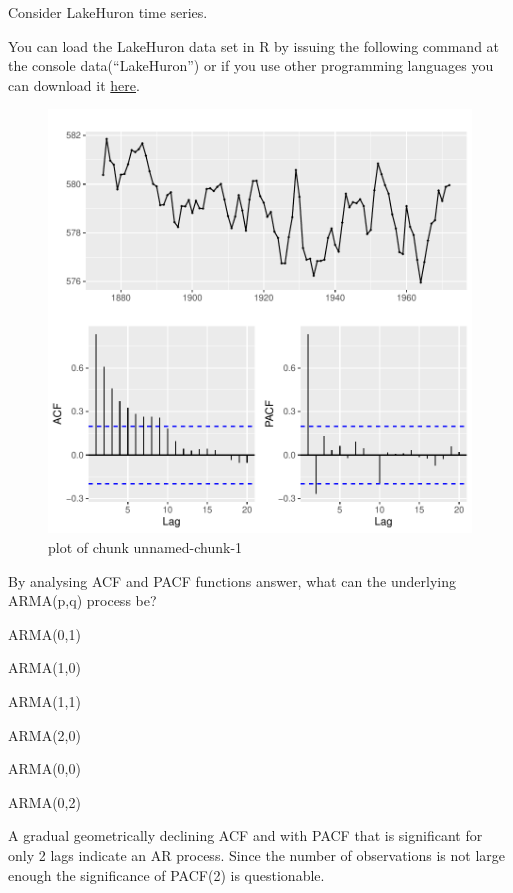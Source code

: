 
\begin{question}
Consider LakeHuron time series.

You can load the LakeHuron data set in R by issuing the following command at the console data(``LakeHuron'') or if you use other programming languages you can download it \href{https://github.com/vincentarelbundock/Rdatasets/blob/master/csv/datasets/LakeHuron.csv}{here}.

\begin{figure}[H]
\centering
\includegraphics{unnamed-chunk-1-1-3.pdf}
\caption{plot of chunk unnamed-chunk-1}
\end{figure}

By analysing ACF and PACF functions answer, what can the underlying ARMA(p,q) process be?
\begin{answerlist}
  \item ARMA(0,1)
  \item ARMA(1,0)
  \item ARMA(1,1)
  \item ARMA(2,0)
  \item ARMA(0,0)
  \item ARMA(0,2)
\end{answerlist}
\end{question}

\begin{solution}
A gradual geometrically declining ACF and with PACF that is significant for only 2 lags indicate an AR process. Since the number of observations is not large enough the significance of PACF(2) is questionable.
\end{solution}

